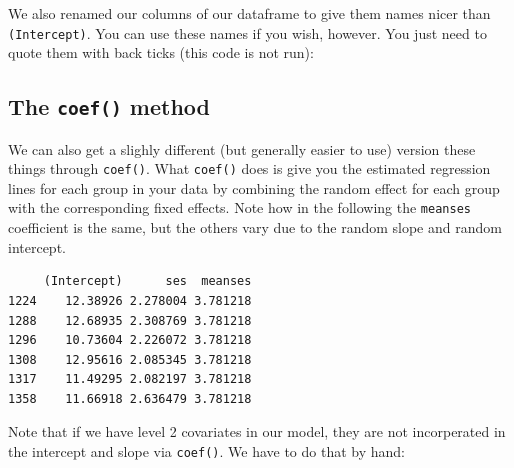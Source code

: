 \documentclass[
  letterpaper,
  DIV=11,
  numbers=noendperiod]{scrreprt}
\newenvironment{Shaded}{}{}
\newcommand{\AttributeTok}[1]{\textcolor[rgb]{0.49,0.56,0.16}{#1}}
\newcommand{\FunctionTok}[1]{\textcolor[rgb]{0.02,0.16,0.49}{#1}}
\newcommand{\NormalTok}[1]{#1}
\newcommand{\OtherTok}[1]{\textcolor[rgb]{0.00,0.44,0.13}{#1}}
\newcommand{\SpecialCharTok}[1]{\textcolor[rgb]{0.25,0.44,0.63}{#1}}
\newcommand{\StringTok}[1]{\textcolor[rgb]{0.25,0.44,0.63}{#1}}
\begin{document}
We also renamed our columns of our dataframe to give them names nicer
than \texttt{(Intercept)}. You can use these names if you wish, however.
You just need to quote them with back ticks (this code is not run):

\begin{Shaded}
\end{Shaded}

\subsection{\texorpdfstring{The \texttt{coef()}
method}{The coef() method}}\label{the-coef-method}

We can also get a slighly different (but generally easier to use)
version these things through \texttt{coef()}. What \texttt{coef()} does
is give you the estimated regression lines for each group in your data
by combining the random effect for each group with the corresponding
fixed effects. Note how in the following the \texttt{meanses}
coefficient is the same, but the others vary due to the random slope and
random intercept.

\begin{Shaded}
\end{Shaded}

\begin{verbatim}
     (Intercept)      ses  meanses
1224    12.38926 2.278004 3.781218
1288    12.68935 2.308769 3.781218
1296    10.73604 2.226072 3.781218
1308    12.95616 2.085345 3.781218
1317    11.49295 2.082197 3.781218
1358    11.66918 2.636479 3.781218
\end{verbatim}

Note that if we have level 2 covariates in our model, they are not
incorperated in the intercept and slope via \texttt{coef()}. We have to
do that by hand:
\end{document}
